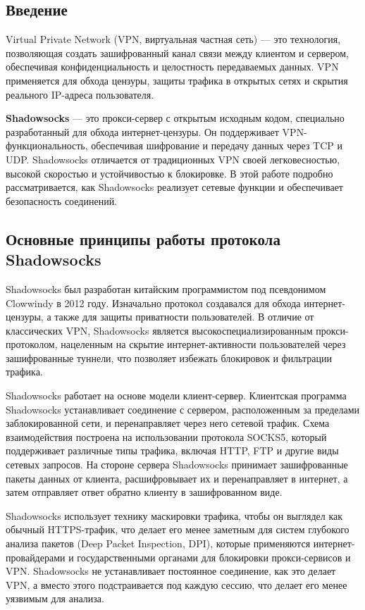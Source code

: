 \documentclass{SCWorks}
\begin{document}
\subsection{Введение}
Virtual Private Network (VPN, виртуальная частная сеть) — это технология, позволяющая создать зашифрованный канал связи между клиентом и сервером, обеспечивая конфиденциальность и целостность передаваемых данных. VPN применяется для обхода цензуры, защиты трафика в открытых сетях и скрытия реального IP-адреса пользователя.

\textbf{Shadowsocks} — это прокси-сервер с открытым исходным кодом, специально разработанный для обхода интернет-цензуры. Он поддерживает VPN-функциональность, обеспечивая шифрование и передачу данных через TCP и UDP. Shadowsocks отличается от традиционных VPN своей легковесностью, высокой скоростью и устойчивостью к блокировке. В этой работе подробно рассматривается, как Shadowsocks реализует сетевые функции и обеспечивает безопасность соединений.

\subsection{Основные принципы работы протокола Shadowsocks}

\textbf{}Shadowsocks был разработан китайским программистом под псевдонимом Clowwindy в 2012 году. Изначально протокол создавался для обхода интернет-цензуры, а также для защиты приватности пользователей. В отличие от классических VPN, Shadowsocks является высокоспециализированным прокси-протоколом, нацеленным на скрытие интернет-активности пользователей через зашифрованные туннели, что позволяет избежать блокировок и фильтрации трафика.

\textbf{}Shadowsocks работает на основе модели клиент-сервер. Клиентская программа Shadowsocks устанавливает соединение с сервером, расположенным за пределами заблокированной сети, и перенаправляет через него сетевой трафик. Схема взаимодействия построена на использовании протокола SOCKS5, который поддерживает различные типы трафика, включая HTTP, FTP и другие виды сетевых запросов. На стороне сервера Shadowsocks принимает зашифрованные пакеты данных от клиента, расшифровывает их и перенаправляет в интернет, а затем отправляет ответ обратно клиенту в зашифрованном виде.

\textbf{}Shadowsocks использует технику маскировки трафика, чтобы он выглядел как обычный HTTPS-трафик, что делает его менее заметным для систем глубокого анализа пакетов (Deep Packet Inspection, DPI), которые применяются интернет-провайдерами и государственными органами для блокировки прокси-сервисов и VPN. Shadowsocks не устанавливает постоянное соединение, как это делает VPN, а вместо этого подстраивается под каждую сессию, что делает его менее уязвимым для анализа.
\end{document}
